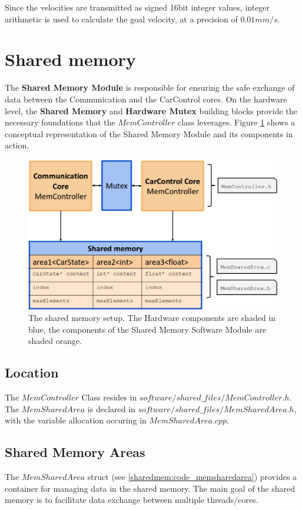 Since the velocities are transmitted as signed 16bit integer values, integer arithmetic is used to calculate the goal velocity, at a precision of $0.01mm/s$.

\section{Shared memory}
The \textbf{Shared Memory Module} is responsible for ensuring the safe exchange of data between the Communication and the CarControl cores. On the hardware level, the \textbf{Shared Memory} and \textbf{Hardware Mutex} building blocks provide the necessary foundations that the \textbf{$MemController$} class leverages. Figure \ref{sharedmem:pic_overview} shows a conceptual representation of the Shared Memory Module and its components in action.

\begin{figure}[h]\label{sharedmem:pic_overview}
  \caption{The shared memory setup. The Hardware components are shaded in blue, the components of the Shared Memory Software Module are shaded orange.}
  \centering
    \includegraphics[width=1.0\textwidth]{figures/shared_memory.png}
\end{figure}

\subsection{Location}
The $MemController$ Class resides in $software/shared\_files/MemController.h$. The $MemSharedArea$ is declared in $software/shared\_files/MemSharedArea.h$, with the variable allocation occuring in $MemSharedArea.cpp$.

\subsection{Shared Memory Areas}
The \textbf{$MemSharedArea$} struct (see \ref{sharedmem:code_memsharedarea}) provides a container for managing data in the shared memory. The main goal of the shared memory is to facilitate data exchange between multiple threads/cores.

